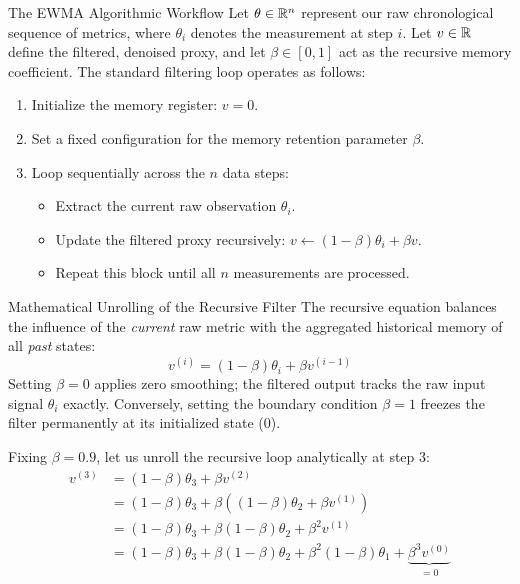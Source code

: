 \begin{frame}{The EWMA Algorithmic Workflow}
	Let $\theta \in \mathbb{R}^n$ represent our raw chronological sequence of metrics, where $\theta_i$ denotes the measurement at step $i$. Let $v \in \mathbb{R}$ define the filtered, denoised proxy, and let $\beta \in [0, 1]$ act as the recursive memory coefficient. The standard filtering loop operates as follows:
	
	\begin{enumerate}
		\item Initialize the memory register: $v = 0$.
		\item Set a fixed configuration for the memory retention parameter $\beta$.
		\item Loop sequentially across the $n$ data steps:
		\begin{itemize}
			\item Extract the current raw observation $\theta_i$.
			\item Update the filtered proxy recursively: $v \leftarrow (1 - \beta) \theta_i + \beta v$.
			\item Repeat this block until all $n$ measurements are processed.
		\end{itemize}
	\end{enumerate}
\end{frame}

\begin{frame}{Mathematical Unrolling of the Recursive Filter}
	The recursive equation balances the influence of the \textit{current} raw metric with the aggregated historical memory of all \textit{past} states:
	\begin{equation*}
		v^{(i)} = (1 - \beta) \theta_i + \beta v^{(i-1)}
	\end{equation*}
	Setting $\beta = 0$ applies zero smoothing; the filtered output tracks the raw input signal $\theta_i$ exactly. Conversely, setting the boundary condition $\beta = 1$ freezes the filter permanently at its initialized state ($0$).
	
	\pause
	\vspace{0.5cm}
	
	Fixing $\beta = 0.9$, let us unroll the recursive loop analytically at step 3:
	\begin{equation*}
		\begin{aligned}
			v^{(3)} 
			&= (1 - \beta) \theta_3 + \beta v^{(2)} \\
			&= (1 - \beta) \theta_3 + \beta \left((1 - \beta) \theta_{2} + \beta v^{(1)} \right) \\
			&= (1 - \beta) \theta_3 + \beta (1 - \beta) \theta_{2} + \beta^2 v^{(1)} \\
			&= (1 - \beta) \theta_3 + \beta (1 - \beta) \theta_{2} + \beta^2 (1 - \beta) \theta_{1} + \underbrace{\beta^3 v^{(0)}}_{= 0}
		\end{aligned}
	\end{equation*}
\end{frame}


